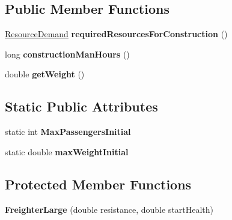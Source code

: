 \subsection*{Public Member Functions}
\begin{DoxyCompactItemize}
\item 
\hyperlink{classuniverse_1_1_resource_demand}{Resource\+Demand} {\bfseries required\+Resources\+For\+Construction} ()\hypertarget{classtools_1_1vehicles_1_1space_1_1_freighter_large_a2aa7a677dec709f2c25289b7cb1c4d46}{}\label{classtools_1_1vehicles_1_1space_1_1_freighter_large_a2aa7a677dec709f2c25289b7cb1c4d46}

\item 
long {\bfseries construction\+Man\+Hours} ()\hypertarget{classtools_1_1vehicles_1_1space_1_1_freighter_large_aa352a60ba566cb26c0e910b3aeb028d2}{}\label{classtools_1_1vehicles_1_1space_1_1_freighter_large_aa352a60ba566cb26c0e910b3aeb028d2}

\item 
double {\bfseries get\+Weight} ()\hypertarget{classtools_1_1vehicles_1_1space_1_1_freighter_large_a7e401e2b130366cbc0ca27781b13bb53}{}\label{classtools_1_1vehicles_1_1space_1_1_freighter_large_a7e401e2b130366cbc0ca27781b13bb53}

\end{DoxyCompactItemize}
\subsection*{Static Public Attributes}
\begin{DoxyCompactItemize}
\item 
static int {\bfseries Max\+Passengers\+Initial}\hypertarget{classtools_1_1vehicles_1_1space_1_1_freighter_large_a659d4b2e97a4a37d22bfcaebd6348702}{}\label{classtools_1_1vehicles_1_1space_1_1_freighter_large_a659d4b2e97a4a37d22bfcaebd6348702}

\item 
static double {\bfseries max\+Weight\+Initial}\hypertarget{classtools_1_1vehicles_1_1space_1_1_freighter_large_ad6eaeca88dd084321ee2607f33396ad6}{}\label{classtools_1_1vehicles_1_1space_1_1_freighter_large_ad6eaeca88dd084321ee2607f33396ad6}

\end{DoxyCompactItemize}
\subsection*{Protected Member Functions}
\begin{DoxyCompactItemize}
\item 
{\bfseries Freighter\+Large} (double resistance, double start\+Health)\hypertarget{classtools_1_1vehicles_1_1space_1_1_freighter_large_aa9f4e6196eb779e5d7dc97d706908e4b}{}\label{classtools_1_1vehicles_1_1space_1_1_freighter_large_aa9f4e6196eb779e5d7dc97d706908e4b}

\end{DoxyCompactItemize}
